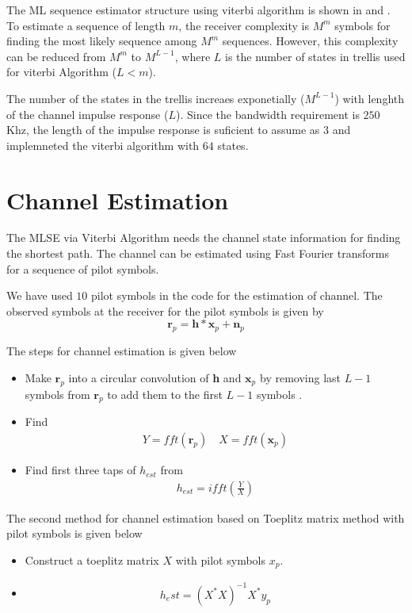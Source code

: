 \documentclass[journal,12pt,twocolumn]{IEEEtran}
\begin{document}
The ML sequence estimator structure using viterbi algorithm  \cite{viterbi} is shown in \cite{MLSE} and \cite{Proakis}.
To estimate a sequence of length $m$, the receiver complexity is $M^m$ symbols for finding the most likely sequence among $M^m$ sequences. However, this complexity can be reduced from $M^m$ to $M^{L-1}$, where $L$ is the number of states in trellis used for viterbi Algorithm ($L < m$).

The number of the states in the trellis increaes exponetially ($M^{L-1}$) with lenghth of the channel impulse response ($L$). Since the bandwidth requirement is $250$ Khz, the length of the impulse response is suficient to assume as $3$ and implemneted the viterbi algorithm with $64$ states.

\section{Channel Estimation}
The MLSE via Viterbi Algorithm needs the channel state information for finding the shortest path. The channel can be estimated using Fast Fourier transforms for a sequence of pilot symbols.

We have used $10$ pilot symbols in the code for the estimation of channel. The observed symbols at the receiver  for the pilot symbols is given by
\begin{equation}
\textbf{r}_{p} = \textbf{h}*\textbf{x}_{p} + \textbf{n}_{p}
\end{equation}

The steps for channel estimation is given below 
\begin{itemize}
\item Make $\textbf{r}_{p}$ into a circular convolution of \textbf{h} and $\textbf{x}_{p}$ by removing  last $L-1$ symbols from $\textbf{r}_{p}$ to add them to the first $L-1$ symbols .
\item Find 
\begin{align}
Y = fft \left(\textbf{r}_{p}\right) \quad X = fft \left(\textbf{x}_{p}\right) 
\end{align}
\item Find first three taps of $h_{est}$ from
\begin{align}
h_{est} = ifft\left(\frac{Y}{X}\right)
\end{align}
 \end{itemize}
 
The second method for channel estimation based on Toeplitz matrix method with pilot symbols is given below
\begin{itemize}
\item Construct a toeplitz matrix $X$  with pilot symbols $x_p$.
\item 
\begin{align}
h_est = \left(X^{*}X\right)^{-1}X^{*}y_p
\end{align}
\end{itemize}
\end{document}
